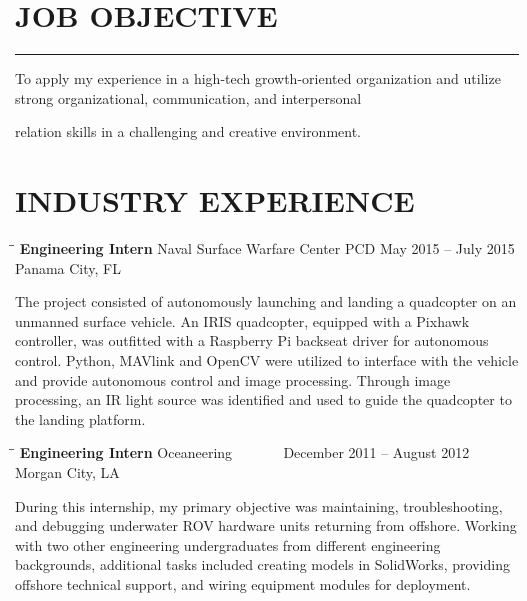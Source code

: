 \documentclass{res}
\begin{document}
 


\address{\bf  PRESENT ADDRESS\\Southlake Avenue\\Baton Rouge, LA 70804}
\address{\bf PERMANENT ADDRESS \\Smith Drive\\  Walker , LA 70785}
                                  
\begin{resume}

\section{JOB OBJECTIVE}  
\rule{\textwidth}{1pt}
    To apply my experience in a high-tech growth-oriented organization and utilize strong organizational, communication, and interpersonal
    
    relation skills in a challenging and creative environment.      
    
\section{INDUSTRY EXPERIENCE}
\vspace{-0.1in}	
\begin{tabbing}
	\hspace{2.3in}\= \hspace{2.6in}\= \kill %
	{\bf Engineering Intern} \>Naval Surface Warfare Center PCD     \>May 2015 – July 2015\\
	\>Panama City, FL
\end{tabbing}\vspace{-20pt}      %
The project consisted of autonomously launching and landing a quadcopter on an unmanned surface vehicle. An IRIS quadcopter, equipped with a Pixhawk controller, was outfitted with a Raspberry Pi backseat driver for autonomous control. Python, MAVlink and OpenCV were utilized to interface with the vehicle and provide autonomous control and image processing. Through image processing, an IR light source was identified and used to guide the quadcopter to the landing platform.
\begin{tabbing}
	\hspace{2.3in}\= \hspace{2.6in}\= \kill %
	{\bf Engineering Intern} \>Oceaneering \> ~~~~~~ December 2011 – August 2012\\
	\>Morgan City, LA
\end{tabbing}\vspace{-20pt}
During this internship, my primary objective was maintaining, troubleshooting, and debugging underwater ROV hardware units returning from offshore. Working with two other engineering undergraduates from different engineering backgrounds, additional tasks included creating models in SolidWorks, providing offshore technical support, and wiring equipment modules for deployment.


\end{resume}
\end{document}
